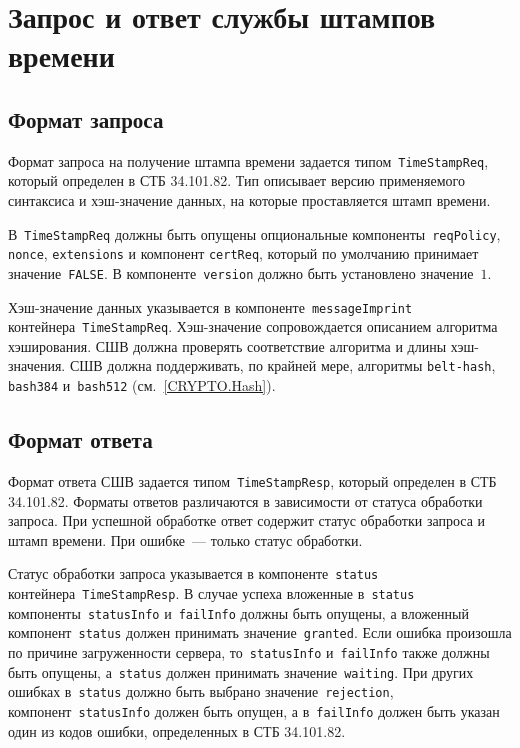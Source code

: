 \section{Запрос и ответ службы штампов времени}\label{FMT.TSP}

\subsection{Формат запроса}\label{FMT.TSP.Req}

Формат запроса на получение штампа времени задается 
типом~\texttt{TimeStampReq}, который определен в СТБ 34.101.82. Тип 
описывает версию применяемого синтаксиса и хэш-значение данных, на которые 
проставляется штамп времени.

В~\texttt{TimeStampReq} должны быть опущены опциональные 
компоненты~\texttt{reqPolicy}, \texttt{nonce}, \texttt{extensions} и компонент 
\texttt{certReq}, который по умолчанию принимает значение~\texttt{FALSE}. 
%
В компоненте~\texttt{version} должно быть установлено значение~$1$.

Хэш-значение данных указывается в компоненте~\texttt{messageImprint}
контейнера~\texttt{TimeStampReq}.
Хэш-значение сопровождается описанием алгоритма хэширования.
СШВ должна проверять соответствие алгоритма и длины хэш-значения.
СШВ должна поддерживать, по крайней мере, алгоритмы \texttt{belt-hash},
\texttt{bash384} и~\texttt{bash512} (см.~\ref{CRYPTO.Hash}).

\subsection{Формат ответа}\label{FMT.TSP.Resp}
 
Формат ответа СШВ задается типом~\texttt{TimeStampResp}, который определен 
в СТБ 34.101.82. Форматы ответов различаются в зависимости от статуса 
обработки запроса. При успешной обработке ответ содержит статус обработки 
запроса и штамп времени. При ошибке~--- только статус обработки.

Статус обработки запроса указывается в компоненте~\texttt{status}
контейнера~\texttt{TimeStampResp}.
%
В случае успеха вложенные в~\texttt{status} компоненты~\texttt{statusInfo} 
и~\texttt{failInfo} должны быть опущены, а вложенный
компонент~\texttt{status} должен принимать значение~\texttt{granted}.
%
Если ошибка произошла по причине загруженности сервера, 
то~\texttt{statusInfo} и~\texttt{failInfo} также должны быть опущены, 
а~\texttt{status} должен принимать значение~\texttt{waiting}.
%
При других ошибках в~\texttt{status} должно быть выбрано 
значение~\texttt{rejection}, компонент~\texttt{statusInfo}
должен быть опущен, а в~\texttt{failInfo} должен быть указан один из 
кодов ошибки, определенных в СТБ 34.101.82.

